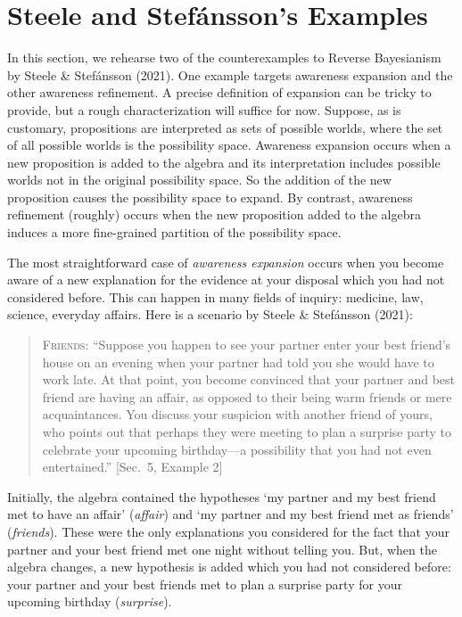 \documentclass[
  11pt,
  dvipsnames,enabledeprecatedfontcommands, todos]{scrartcl}
\begin{document}
\hypertarget{steele-and-stefuxe1nssons-examples}{%
\section{Steele and Stefánsson's
Examples}\label{steele-and-stefuxe1nssons-examples}}

\label{sec:counterexamples}

In this section, we rehearse two of the counterexamples to Reverse
Bayesianism by Steele \& Stefánsson (2021). One example targets
awareness expansion and the other awareness refinement. A precise
definition of expansion can be tricky to provide, but a rough
characterization will suffice for now. Suppose, as is customary,
propositions are interpreted as sets of possible worlds, where the set
of all possible worlds is the possibility space. Awareness expansion
occurs when a new proposition is added to the algebra and its
interpretation includes possible worlds not in the original possibility
space. So the addition of the new proposition causes the possibility
space to expand. By contrast, awareness refinement (roughly) occurs when
the new proposition added to the algebra induces a more fine-grained
partition of the possibility space.

The most straightforward case of \emph{awareness expansion} occurs when
you become aware of a new explanation for the evidence at your disposal
which you had not considered before. This can happen in many fields of
inquiry: medicine, law, science, everyday affairs. Here is a scenario by
Steele \& Stefánsson (2021):

\begin{quote}
\textsc{Friends}: ``Suppose you happen to see your partner enter your
best friend's house on an evening when your partner had told you she
would have to work late. At that point, you become convinced that your
partner and best friend are having an affair, as opposed to their being
warm friends or mere acquaintances. You discuss your suspicion with
another friend of yours, who points out that perhaps they were meeting
to plan a surprise party to celebrate your upcoming birthday---a
possibility that you had not even entertained.'' {[}Sec.~5, Example 2{]}
\end{quote}

\doublespace

\noindent Initially, the algebra contained the hypotheses `my partner
and my best friend met to have an affair' (\textit{affair}) and `my
partner and my best friend met as friends' (\textit{friends}). These
were the only explanations you considered for the fact that your partner
and your best friend met one night without telling you. But, when the
algebra changes, a new hypothesis is added which you had not considered
before: your partner and your best friends met to plan a surprise party
for your upcoming birthday (\textit{surprise}).
\end{document}

